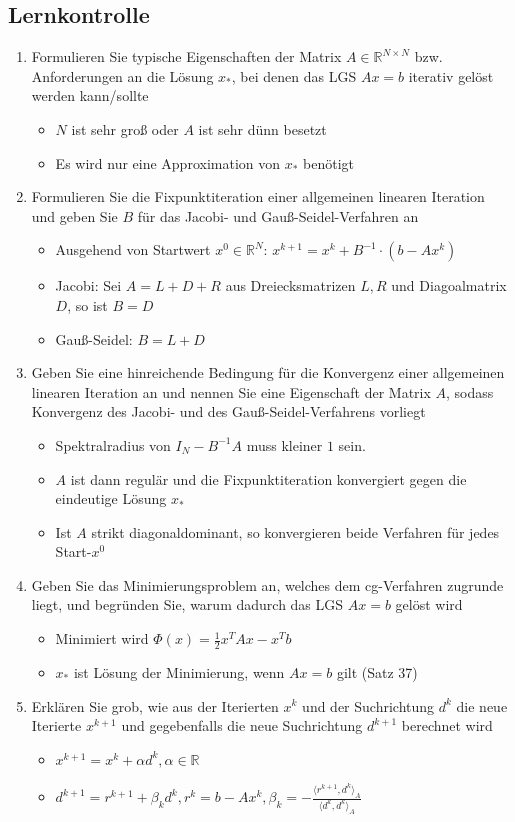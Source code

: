 \documentclass[]{article}
\newcommand*{\real}{\ensuremath{\mathbb{R}}}
\begin{document}
\subsection{Lernkontrolle}
	\begin{enumerate}
		\item Formulieren Sie typische Eigenschaften der Matrix $A \in \real^{N \times N}$ bzw. Anforderungen an die Lösung $x_*$, bei denen das LGS $Ax = b$ iterativ gelöst werden kann/sollte
			\begin{itemize}
				\item $N$ ist sehr groß oder $A$ ist sehr dünn besetzt
				\item Es wird nur eine Approximation von $x_*$ benötigt
			\end{itemize}
		\item Formulieren Sie die Fixpunktiteration einer allgemeinen linearen Iteration und geben Sie $B$ für das Jacobi- und Gauß-Seidel-Verfahren an
			\begin{itemize}
				\item Ausgehend von Startwert $x^0 \in \real^N$: $x^{k+1} = x^k + B^{-1} \cdot (b-Ax^k)$
				\item Jacobi: Sei $A = L + D + R$ aus Dreiecksmatrizen $L, R$ und Diagoalmatrix $D$, so ist $B=D$
				\item Gauß-Seidel: $B = L+D$
			\end{itemize}
		\item Geben Sie eine hinreichende Bedingung für die Konvergenz einer allgemeinen linearen Iteration an und nennen Sie eine Eigenschaft der Matrix $A$, sodass Konvergenz des Jacobi- und des Gauß-Seidel-Verfahrens vorliegt
			\begin{itemize}
				\item Spektralradius von $I_N-B^{-1}A$ muss kleiner $1$ sein.
				\item $A$ ist dann regulär und die Fixpunktiteration konvergiert gegen die eindeutige Lösung $x_*$
				\item Ist $A$ strikt diagonaldominant, so konvergieren beide Verfahren für jedes Start-$x^0$
			\end{itemize}
		\item Geben Sie das Minimierungsproblem an, welches dem cg-Verfahren zugrunde liegt, und begründen Sie, warum dadurch das LGS $Ax=b$ gelöst wird
			\begin{itemize}
				\item Minimiert wird $\Phi(x) = \frac{1}{2}x^TAx - x^Tb$
				\item $x_*$ ist Lösung der Minimierung, wenn $Ax = b$ gilt (Satz 37)
			\end{itemize}
		\item Erklären Sie grob, wie aus der Iterierten $x^k$ und der Suchrichtung $d^k$ die neue Iterierte $x^{k+1}$ und gegebenfalls die neue Suchrichtung $d^{k+1}$ berechnet wird
			\begin{itemize}
				\item $x^{k+1} = x^k + \alpha d^k, \alpha \in \real$
				\item $d^{k+1} = r^{k+1} + \beta_k d^k, r^k = b-Ax^k, \beta_k = - \frac{\langle r^{k+1}, d^k \rangle_A}{\langle d^k, d^k \rangle_A}$
			\end{itemize}
	\end{enumerate}	
\end{document}
